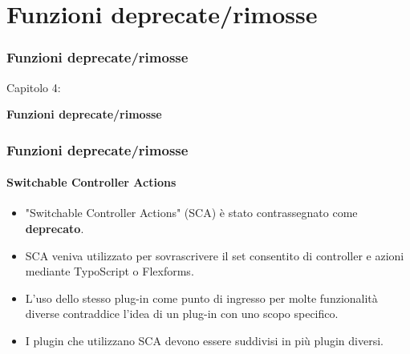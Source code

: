 %

\section{Funzioni deprecate/rimosse}
\begin{frame}[fragile]
	\frametitle{Funzioni deprecate/rimosse}

	\begin{center}\huge{Capitolo 4:}\end{center}
	\begin{center}\huge{\color{typo3darkgrey}\textbf{Funzioni deprecate/rimosse}}\end{center}

\end{frame}


\begin{frame}[fragile]
	\frametitle{Funzioni deprecate/rimosse}
	\framesubtitle{Switchable Controller Actions}

	\begin{itemize}
		\item "Switchable Controller Actions" (SCA) è stato contrassegnato come \textbf{deprecato}.
		\item SCA veniva utilizzato per sovrascrivere il set consentito di controller e azioni mediante TypoScript o Flexforms.
		\item L'uso dello stesso plug-in come punto di ingresso per molte funzionalità diverse contraddice l'idea di un plug-in con uno scopo specifico.
		\item I plugin che utilizzano SCA devono essere suddivisi in più plugin diversi.
	\end{itemize}

\end{frame}


